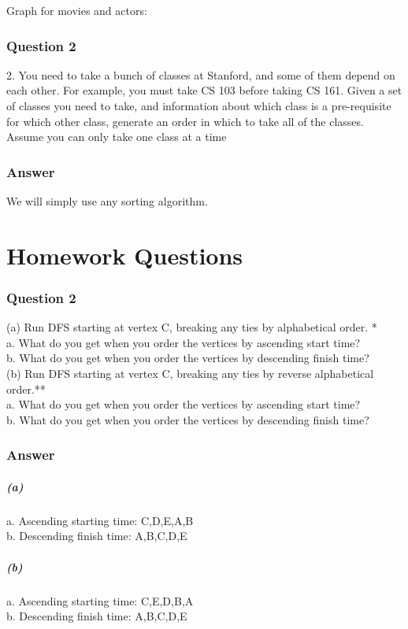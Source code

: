 \documentclass[10pt]{article}
\begin{document}
Graph for movies and actors: \\

\section*{Question 2}

2. You need to take a bunch of classes at Stanford, and some of them depend on each other.
For example, you must take CS 103 before taking CS 161. Given a set of classes you need
to take, and information about which class is a pre-requisite for which other class, generate
an order in which to take all of the classes. Assume you can only take one class at a time


\section*{Answer}
We will simply use any sorting algorithm. 
\part*{Homework Questions}

\section*{Question 2}
(a) Run DFS starting at vertex C, breaking any ties by alphabetical order. *\\
a. What do you get when you order the vertices by ascending start time?\\
b. What do you get when you order the vertices by descending finish time?\\
(b) Run DFS starting at vertex C, breaking any ties by reverse alphabetical order.**\\
a. What do you get when you order the vertices by ascending start time?\\
b. What do you get when you order the vertices by descending finish time? 

\section*{Answer }

\subsubsection*{(a)}

a. Ascending starting time: C,D,E,A,B\\
b. Descending finish time: A,B,C,D,E\\
	

\subsubsection*{(b)}
a. Ascending starting time: C,E,D,B,A\\
b. Descending finish time: A,B,C,D,E\\
\end{document}
